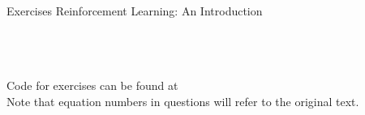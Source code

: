 




{\huge Exercises} \hfill {\huge Reinforcement Learning: An Introduction}\\
\Rule\\
\tableofcontents
\mbox{}\\
\Rule
\mbox{}\\
\clearpage

\vfill
\begin{center}
    Code for exercises can be found at \href{\RepoAddress{}}{\RepoName{}}\\[2cm]
    Note that equation numbers in questions will refer to the original text.
\end{center}
\vfill
\clearpage


\setcounter{secnumdepth}{1}




















